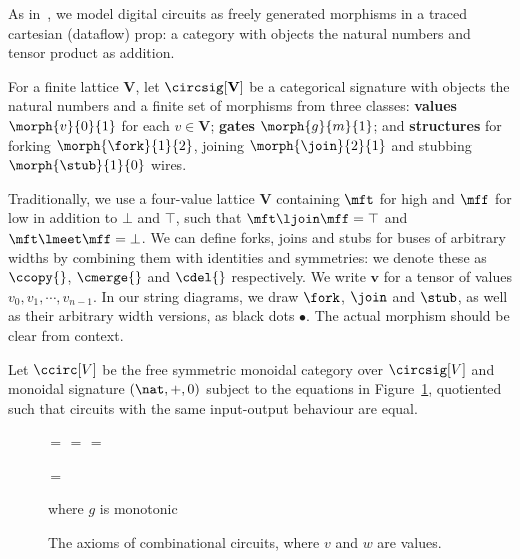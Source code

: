 \documentclass[11pt,numbib]{article}
\begin{document}
As in~\cite{ghica2016categorical}, we model digital circuits as freely generated morphisms in a traced cartesian (dataflow) prop: a category with objects the natural numbers and tensor product as addition.

\begin{definition}
    For a finite lattice $\textbf{V}$, let $\circsig[\textbf{V}]$ be a categorical signature with objects the natural numbers and a finite set of morphisms from three classes: \textbf{values} $\morph{v}{0}{1}$ for each $v \in \textbf{V}$; \textbf{gates} $\morph{g}{m}{1}$; and \textbf{structures} for forking $\morph{\fork}{1}{2}$, joining $\morph{\join}{2}{1}$ and stubbing $\morph{\stub}{1}{0}$ wires.
\end{definition}

\noindent
Traditionally, we use a four-value lattice $\textbf{V}$ containing $\mft$ for high and $\mff$ for low in addition to $\bot$ and $\top$, such that $\mft \ljoin \mff = \top$ and $\mft \lmeet \mff = \bot$.
We can define forks, joins and stubs for buses of arbitrary widths by combining them with identities and symmetries: we denote these as $\ccopy{}$, $\cmerge{}$ and $\cdel{}$ respectively.
We write $\textbf{v}$ for a tensor of values $v_0,v_1,\cdots,v_{n-1}$.
In our string diagrams, we draw $\fork$, $\join$ and $\stub$, as well as their arbitrary width versions, as black dots $\bullet$.
The actual morphism should be clear from context.

\begin{definition}
    Let $\ccirc[V]$ be the free symmetric monoidal category over $\circsig[V]$ and monoidal signature $(\nat,+,0)$ subject to the equations in Figure~\ref{fig:combinational}, quotiented such that circuits with the same input-output behaviour are equal.
\end{definition}

\begin{figure}
    \centering
    \,=\,
    \quad\quad
    \,=\,
    \quad\quad
    \,=\,
    \quad\quad
    \begin{minipage}{10em}
        \vspace{1.5em}

        \begin{center}
            \,=\,

            \vspace{0.5em}

            \footnotesize where $g$ is monotonic
        \end{center}
    \end{minipage}
    \caption{The axioms of combinational circuits, where $v$ and $w$ are values.}
    \label{fig:combinational}
\end{figure}
\end{document}
